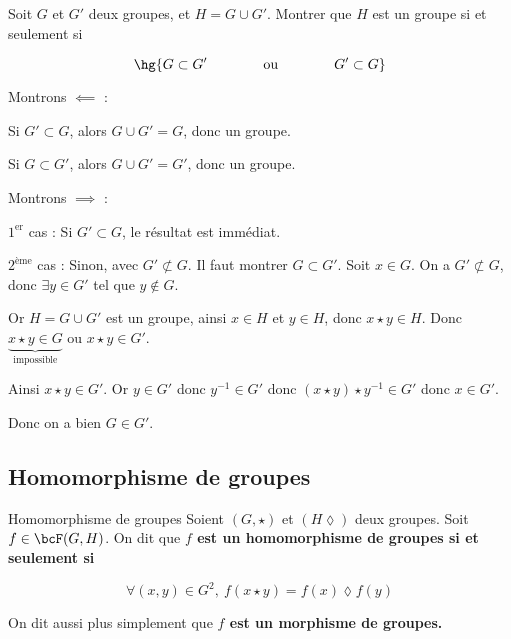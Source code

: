 \documentclass[a4paper,french,bookmarks]{article}
\begin{document}
\begin{exercise}{}{}
    Soit $G$ et $G'$ deux groupes, et $H = G \cup G'$. Montrer que $H$ est un groupe si et seulement si
    
    \[ \hg{G \subset G' \qquad\qquad\text{ou}\qquad\qquad G' \subset G}\]
    
    \tcblower
    
    \begin{enumerate}
        \ithand Montrons $\boxed{\impliedby}$ : \begin{enumerate}
            \itstar Si $G' \subset G$, alors $G \cup G' = G$, donc un groupe.
            
            \itstar Si $G \subset G'$, alors $G \cup G' = G'$, donc un groupe.
        \end{enumerate}
        
        \ithand Montrons $\boxed{\implies}$ : \begin{enumerate}
        
            \itstar $1^{\text{er}}$ cas : Si $G' \subset G$, le résultat est immédiat.
            
            \itstar $2^{\text{ème}}$ cas : Sinon, avec $G' \not\subset G$. Il faut montrer $G \subset G'$. Soit $x \in G$. On a $G' \not\subset G$, donc $\exists y \in G'$ tel que $y \not \in G$.
            
            Or $H = G \cup G'$ est un groupe, ainsi $x \in H$ et $y \in H$, donc $x \star y \in H$. Donc $\underbrace{x \star y \in G}_{\text{impossible}}$ ou $x \star y \in G'$.
            
            Ainsi $x \star y \in G'$. Or $y \in G'$ donc $y^{-1} \in G'$ donc $(x \star y) \star y^{-1} \in G'$ donc $x \in G'$.
            
            Donc on a bien $G \in G'$.
        \end{enumerate}
    \end{enumerate}
\end{exercise}

\subsection{Homomorphisme de groupes}

\begin{definition}{Homomorphisme de groupes}{}
    Soient $(G, \star)$ et $(H \lozenge)$ deux groupes. Soit $f \in \bcF(G, H)$. On dit que \bf{$f$ est un homomorphisme de groupes} si et seulement si 
    
    \[ \forall (x, y) \in G^2, \ f(x\star y) = f(x) \lozenge f(y)\]
    
    On dit aussi plus simplement que \bf{$f$ est un morphisme de groupes}.
\end{definition}
\end{document}

